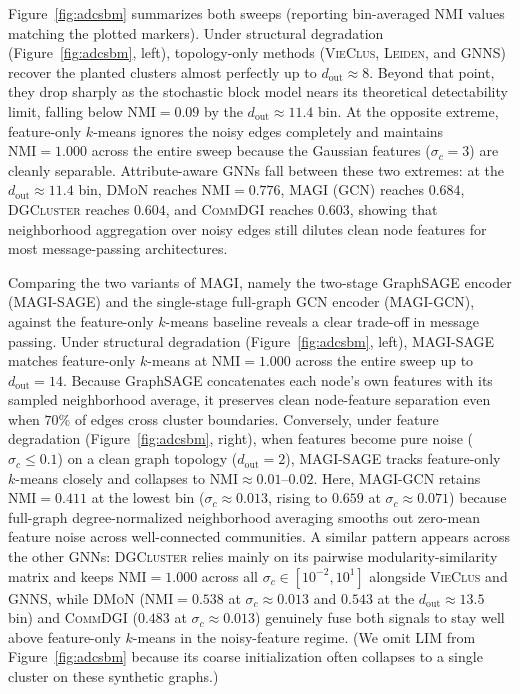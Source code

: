 \documentclass[11pt,a4paper]{article}
\begin{document}
Figure~\ref{fig:adcsbm} summarizes both sweeps (reporting bin-averaged NMI values matching the plotted markers). Under structural degradation (Figure~\ref{fig:adcsbm}, left), topology-only methods (\textsc{VieClus}, \textsc{Leiden}, and \textsc{GNNS}) recover the planted clusters almost perfectly up to $d_{\text{out}} \approx 8$. Beyond that point, they drop sharply as the stochastic block model nears its theoretical detectability limit, falling below $\text{NMI} = 0.09$ by the $d_{\text{out}} \approx 11.4$ bin. At the opposite extreme, feature-only $k$-means ignores the noisy edges completely and maintains $\text{NMI} = 1.000$ across the entire sweep because the Gaussian features ($\sigma_c = 3$) are cleanly separable. Attribute-aware GNNs fall between these two extremes: at the $d_{\text{out}} \approx 11.4$ bin, \textsc{DMoN} reaches $\text{NMI} = 0.776$, \textsc{MAGI} (GCN) reaches $0.684$, \textsc{DGCluster} reaches $0.604$, and \textsc{CommDGI} reaches $0.603$, showing that neighborhood aggregation over noisy edges still dilutes clean node features for most message-passing architectures.

Comparing the two variants of \textsc{MAGI}, namely the two-stage GraphSAGE encoder (\textsc{MAGI}-SAGE) and the single-stage full-graph GCN encoder (\textsc{MAGI}-GCN), against the feature-only $k$-means baseline reveals a clear trade-off in message passing. Under structural degradation (Figure~\ref{fig:adcsbm}, left), \textsc{MAGI}-SAGE matches feature-only $k$-means at $\text{NMI} = 1.000$ across the entire sweep up to $d_{\text{out}} = 14$. Because GraphSAGE concatenates each node's own features with its sampled neighborhood average, it preserves clean node-feature separation even when $70\%$ of edges cross cluster boundaries. Conversely, under feature degradation (Figure~\ref{fig:adcsbm}, right), when features become pure noise ($\sigma_c \le 0.1$) on a clean graph topology ($d_{\text{out}} = 2$), \textsc{MAGI}-SAGE tracks feature-only $k$-means closely and collapses to $\text{NMI} \approx 0.01$--$0.02$. Here, \textsc{MAGI}-GCN retains $\text{NMI} = 0.411$ at the lowest bin ($\sigma_c \approx 0.013$, rising to $0.659$ at $\sigma_c \approx 0.071$) because full-graph degree-normalized neighborhood averaging smooths out zero-mean feature noise across well-connected communities. A similar pattern appears across the other GNNs: \textsc{DGCluster} relies mainly on its pairwise modularity-similarity matrix and keeps $\text{NMI} = 1.000$ across all $\sigma_c \in [10^{-2}, 10^{1}]$ alongside \textsc{VieClus} and \textsc{GNNS}, while \textsc{DMoN} ($\text{NMI} = 0.538$ at $\sigma_c \approx 0.013$ and $0.543$ at the $d_{\text{out}} \approx 13.5$ bin) and \textsc{CommDGI} ($0.483$ at $\sigma_c \approx 0.013$) genuinely fuse both signals to stay well above feature-only $k$-means in the noisy-feature regime. (We omit \textsc{LIM} from Figure~\ref{fig:adcsbm} because its coarse initialization often collapses to a single cluster on these synthetic graphs.)
\end{document}
